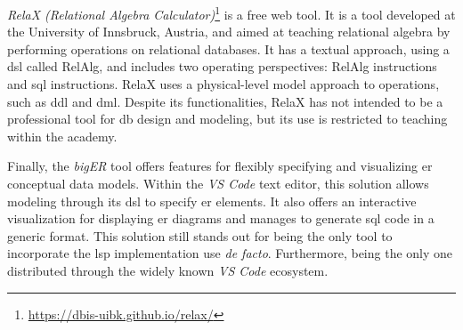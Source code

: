 \textit{RelaX (Relational Algebra Calculator)}\footnote{\url{https://dbis-uibk.github.io/relax/}} is a free web tool. 
It is a tool developed at the University of Innsbruck, Austria, and aimed at teaching relational algebra by performing operations on relational databases.
It has a textual approach, using a \ac{dsl} called RelAlg, and includes two operating perspectives: RelAlg instructions and \ac{sql} instructions.
RelaX uses a physical-level model approach to operations, such as \ac{ddl} and \ac{dml}.
Despite its functionalities, RelaX has not intended to be a professional tool for \ac{db} design and modeling, but its use is restricted to teaching within the academy.

Finally, the \textit{bigER} tool offers features for flexibly specifying and visualizing \ac{er} conceptual data models. 
Within the \textit{VS Code} text editor, this solution allows modeling through its \ac{dsl} to specify \ac{er} elements.
It also offers an interactive visualization for displaying \ac{er} diagrams and manages to generate \ac{sql} code in a generic format.
This solution still stands out for being the only tool to incorporate the \ac{lsp} implementation use \textit{de facto}. Furthermore, being the only one distributed through the widely known \textit{VS Code} ecosystem.


